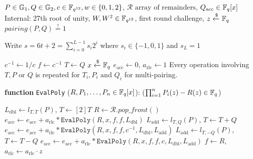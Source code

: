 \begin{algorithm}
\caption{Pairing Verifier: Evaluating remainders}
\label{alg:2r:verifier}
\begin{algorithmic}[1]
\Require $P \in \mathbb{G}_1, Q \in \mathbb{G}_2, c \in \mathbb{F}_{q^{12}}, w \in \{0,1,2\}$, $\mathcal{R} \text{ array of remainders}$, $Q_\text{acc} \in \mathbb{F}_q[x]$
\Statex Internal: 27th root of unity, $W, W^2 \in \mathbb{F}_{q^{12}}$, first round challenge, $z \xleftarrow{\$} \mathbb{F}_q$
\Ensure $pairing(P, Q) \stackrel{?}{=} 1$

\Statex Write $s = 6t + 2 = \sum_{i=0}^{L-1} s_i 2^i$ where $s_i \in \{-1, 0, 1\}$ and $s_L = 1$

\State $c^{-1} \leftarrow 1 / c$ 
\State $f \leftarrow c^{-1}$ 
\State $T \leftarrow Q$ 
\State $x \xleftarrow{\$} \mathbb{F}_q$ 
\State $e_\text{acc} \leftarrow 0$, $a_\text{rlc} \leftarrow 1$ 
\color{gray}
\Statex \small{Every operation involving $T, P \text{ or } Q$ is repeated for $T_i, P_i \text{ and } Q_i$ for multi-pairing.}
\color{black}

\Statex

\State \textbf{function} \texttt{EvalPoly} ({$R, P_1, \ldots, P_n \in \mathbb{F}_q[x]$}): \Return ($\prod_{i=1}^{n} P_i(z) - R(z) \in \mathbb{F}_q$)

\Statex
\Statex {}
    \State $L_\text{dbl} \leftarrow l_{T,T}(P)$, $T \leftarrow [2]T$
    \State $R \leftarrow \mathcal{R}.\textit{pop\_front}()$ 
		\State $e_\text{acc} \leftarrow e_\text{acc} + a_\text{rlc} * \texttt{EvalPoly}(R, x, f, f, L_{\text{dbl}})$ 
        \State $L_\text{add} \leftarrow l_{T,Q}(P)$, $T \leftarrow T + Q$
        \State $e_\text{acc} \leftarrow e_\text{acc} + a_\text{rlc} * \texttt{EvalPoly}(R, x, f, f, c^{-1}, L_\text{dbl}, L_\text{add})$ 
        \State $L_\text{add} \leftarrow l_{T,-Q}(P)$, $T \leftarrow T - Q$
        \State $e_\text{acc} \leftarrow e_\text{acc} + a_\text{rlc} * \texttt{EvalPoly}(R, x, f, f, c, L_\text{dbl}, L_\text{add})$ 
    \EndIf
    \State $f \leftarrow R$, $a_\text{rlc} \leftarrow a_\text{rlc} \cdot z$ 
\EndFor
\Statex


\end{algorithmic}
\end{algorithm}
